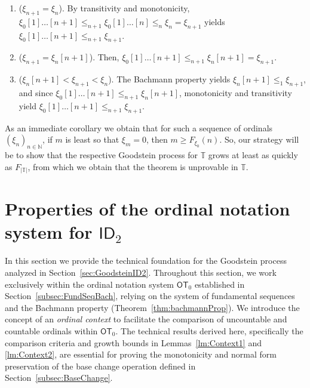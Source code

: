\documentclass{amsart}
\theoremstyle{plain}
\theoremstyle{plain}
\newcommand\OT{\mathsf{OT}}
\newcommand{\ID}{\mathsf{ID}}
\begin{document}
\begin{enumerate}[label*={\sc Case \arabic*},wide, labelwidth=!, labelindent=0pt]

\item ($\xi_{n+1} = \xi_n$).
By transitivity and monotonicity, $\xi_0[1]\ldots [n+1] \leq_{n+1} \xi_0[1]\ldots [n ] \leq _n \xi_n =  \xi_{n+1}$
yields $\xi_0[1]\ldots [n+1] \leq_{n+1}  \xi_{n+1}$.

\item ($\xi_{n+1} = \xi_n[n+1]$).
Then, $\xi_0[1]\ldots [n+1] \leq_{n+1} \xi_n[n+1] = \xi_{n+1}$.


\item ($\xi_n[n+1] < \xi_{n+1} < \xi_n$).
The Bachmann property yields $\xi_n[n+1] \leq_1 \xi_{n+1}$, and since $\xi_0[1]\ldots[n+1] \leq_{n+1} \xi_n[n+1] $, monotonicity and transitivity yield $\xi_0[1]\ldots[n+1] \leq_{n+1} \xi_{n+1} $.\qedhere


\end{enumerate}
\endproof

As an immediate corollary we obtain that for such a sequence of ordinals $(\xi_n)_{n\in\mathbb N}$, if $m$ is least so that $\xi_m = 0$, then $m\geq F_{\xi_0}(n)$.
So, our strategy will be to show that the respective Goodstein process for $\mathbb{T}$ grows at least as quickly as $F_{|\mathbb{T}|}$, from which we obtain that the theorem is unprovable in $\mathbb{T}$.



\section{Properties of the ordinal notation system for \texorpdfstring{$\ID_2$}{ID2}} \label{sec:PropID2}

In this section we provide the technical foundation for the Goodstein process analyzed in Section~\ref{sec:GoodsteinID2}. Throughout this section, we work exclusively within the ordinal notation system $\OT_0$ established in Section~\ref{subsec:FundSeqBach}, relying on the system of fundamental sequences and the Bachmann property (Theorem~\ref{thm:bachmannProp}).
We introduce the concept of an \emph{ordinal context} to facilitate the comparison of uncountable and countable ordinals within $\OT_0$. The technical results derived here, specifically the comparison criteria and growth bounds in Lemmas~\ref{lm:Context1} and \ref{lm:Context2}, are essential for proving the monotonicity and normal form preservation of the base change operation defined in Section~\ref{subsec:BaseChange}.
\end{document}
